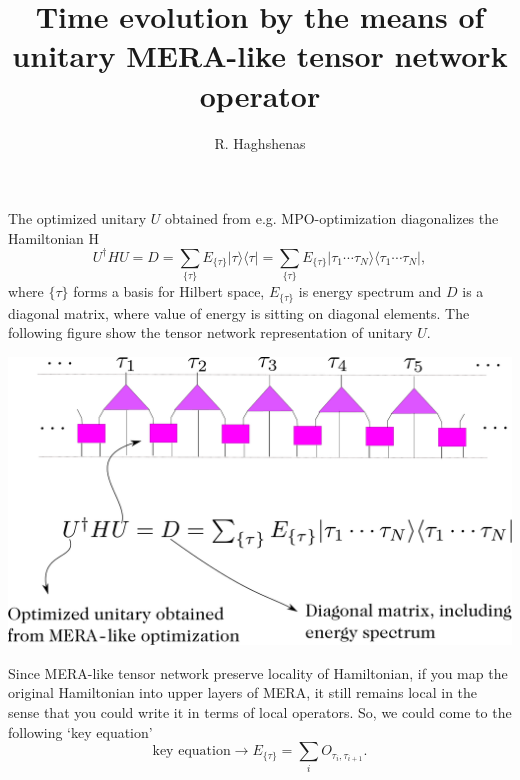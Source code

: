 \documentclass[aps,prb,onecolumn,groupedaddress,notitlepage,showpacs,floatfix,superscriptaddress]{revtex4-1}
\begin{document}
\title{Time evolution by the means of unitary MERA-like tensor network operator}
\author{R. Haghshenas}
\maketitle

The optimized unitary $U$ obtained from e.g. MPO-optimization diagonalizes the Hamiltonian H
\begin{equation*}
U^{\dagger}HU=D=\sum_{\{ \tau  \}} E_{\{\tau\}}|\tau\rangle\langle \tau |=\sum_{\{ \tau  \}} E_{\{\tau\}}|\tau_{1}\cdots \tau_{N}\rangle\langle \tau_{1}\cdots \tau_{N} |, 
\end{equation*}
where $\{\tau\}$ forms a basis for Hilbert space, $E_{\{\tau\}}$ is energy spectrum and $D$ is a diagonal matrix, where value of energy is sitting  on diagonal elements. The following figure show the tensor network representation of unitary $U$.
\begin{center}
\includegraphics[scale=0.3, angle=0, origin=c]{Unitary-tensor-network}
\end{center}
Since MERA-like tensor network preserve locality of Hamiltonian, if you map the original Hamiltonian into upper layers of MERA, it still remains local in the sense that you could write it in terms of local operators. So, we could come to the following `key equation'
\begin{equation}
\text{key equation}\rightarrow E_{\{\tau\}}=\sum_{i}  O_{\tau_{i}, \tau_{i+1}}.
\label{EQ:keyEQ}
\end{equation}
\end{document}
